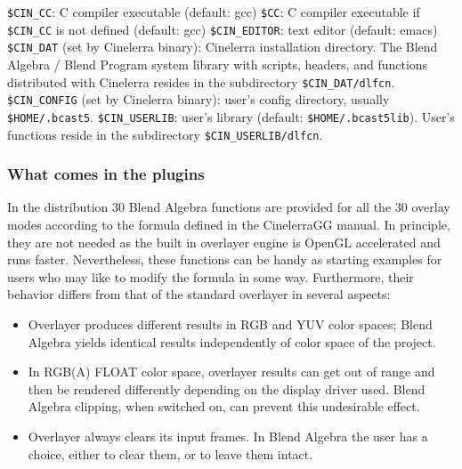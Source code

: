 \texttt{\$CIN\_CC}: C compiler executable (default: gcc) \newline
\texttt{\$CC}: C compiler executable if \texttt{\$CIN\_CC} is not defined (default: gcc) \newline
\texttt{\$CIN\_EDITOR}: text editor (default: emacs) \newline
\texttt{\$CIN\_DAT} (set by Cinelerra binary): Cinelerra installation directory. The Blend Algebra / Blend Program system library with scripts, headers, and functions distributed with Cinelerra resides in the subdirectory \texttt{\$CIN\_DAT/dlfcn}. \newline
\texttt{\$CIN\_CONFIG} (set by Cinelerra binary): user's config directory, usually \\ \texttt{\$HOME/.bcast5}. \newline
\texttt{\$CIN\_USERLIB}: user's library (default: \texttt{\$HOME/.bcast5lib}). User's functions reside in the subdirectory \texttt{\$CIN\_USERLIB/dlfcn}. \newline

\subsubsection*{What comes in the plugins}
\label{ssub:what_comes_plugins}

In the distribution 30 Blend Algebra functions are provided for all the 30 \CGG{} overlay modes according to the formula defined in the CinelerraGG manual. In principle, they are not needed as the built in overlayer engine is OpenGL accelerated and runs faster. Nevertheless, these functions can be handy as starting examples for users who may like to modify the formula in some way. Furthermore, their behavior differs from that of the standard overlayer in several aspects:

\begin{itemize}
	\item Overlayer produces different results in RGB and YUV color spaces; Blend Algebra yields identical results independently of color space of the project.
	\item In RGB(A) FLOAT color space, overlayer results can get out of range and then be rendered differently depending on the display driver used. Blend Algebra clipping, when switched on, can prevent this undesirable effect.
	\item Overlayer always clears its input frames. In Blend Algebra the user has a choice, either to clear them, or to leave them intact.
\end{itemize}

